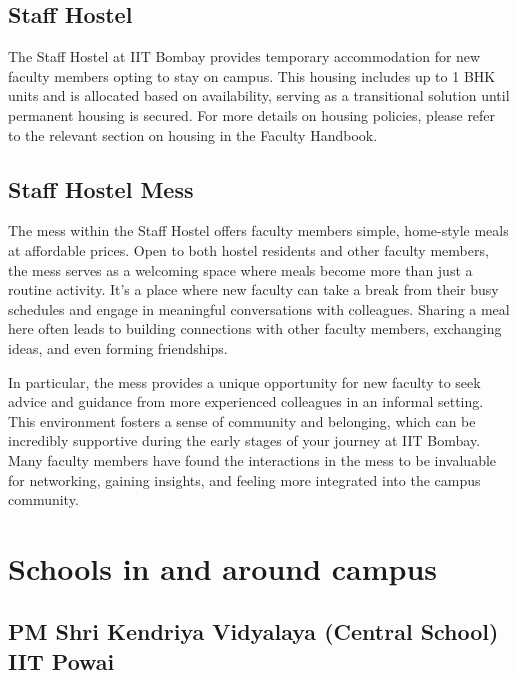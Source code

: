 \documentclass[
  10pt,
  a5paper,
  10pt,
  openany]{amsbook}
\begin{document}
\subsection*{Staff Hostel}\label{staff-hostel}

The Staff Hostel at IIT Bombay provides temporary accommodation for new
faculty members opting to stay on campus. This housing includes up to 1
BHK units and is allocated based on availability, serving as a
transitional solution until permanent housing is secured. For more
details on housing policies, please refer to the relevant section on
housing in the Faculty Handbook.

\subsection*{Staff Hostel Mess}\label{staff-hostel-mess}

The mess within the Staff Hostel offers faculty members simple,
home-style meals at affordable prices. Open to both hostel residents and
other faculty members, the mess serves as a welcoming space where meals
become more than just a routine activity. It's a place where new faculty
can take a break from their busy schedules and engage in meaningful
conversations with colleagues. Sharing a meal here often leads to
building connections with other faculty members, exchanging ideas, and
even forming friendships.

In particular, the mess provides a unique opportunity for new faculty to
seek advice and guidance from more experienced colleagues in an informal
setting. This environment fosters a sense of community and belonging,
which can be incredibly supportive during the early stages of your
journey at IIT Bombay. Many faculty members have found the interactions
in the mess to be invaluable for networking, gaining insights, and
feeling more integrated into the campus community.

\section*{Schools in and around campus}\label{sec:moreschools}


\subsection*{PM Shri Kendriya Vidyalaya (Central School) IIT
Powai}\label{pm-shri-kendriya-vidyalaya-central-school-iit-powai}
\end{document}
